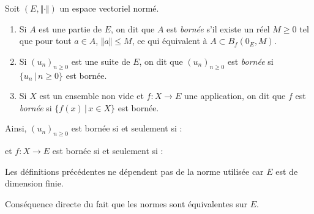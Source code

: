 \documentclass[french,11pt,twoside]{VcCours}
\begin{document}
\begin{Definition}{}
Soit $(E, \Vert \cdot \Vert)$ un espace vectoriel normé.

\begin{enumerate}
\item Si $A$ est une partie de $E$, on dit que $A$ est \emph{bornée} s'il existe un réel $M \geq 0$ tel que pour tout $a \in A$, $\Vert a \Vert \leq M$, ce qui équivalent à $A \subset B_f(0_E,M)$.
\item Si $(u_n)_{n \geq 0}$ est une suite de $E$, on dit que $(u_n)_{n \geq 0}$ est \emph{bornée} si $\lbrace u_n \, \vert \, n \geq 0\rbrace$ est bornée.

\item Si $X$ est un ensemble non vide et $f : X \rightarrow E$ une application, on dit que $f$ est \emph{bornée} si $\lbrace f(x) \, \vert \, x \in X \rbrace$ est bornée.
\end{enumerate}
\end{Definition}

\medskip

Ainsi, $(u_n)_{n \geq 0}$ est bornée si et seulement si :

\vspace*{1cm}

et $f : X \rightarrow E$ est bornée si et seulement si :

\vspace*{1.3cm}

\begin{Theoreme}{} Les définitions précédentes ne dépendent pas de la norme utilisée car $E$ est de dimension finie.
\end{Theoreme}

\begin{Demonstration}{} Conséquence directe du fait que les normes sont équivalentes sur $E$.
\end{Demonstration}

\medskip
\end{document}
